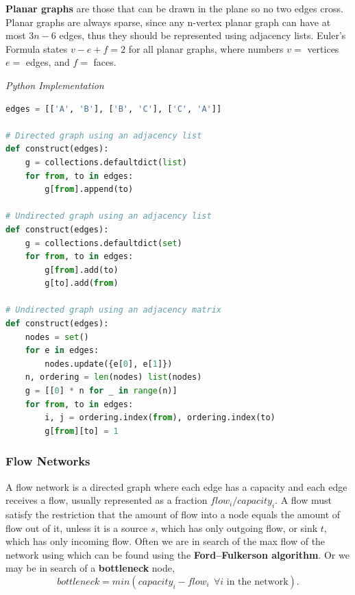 \documentclass{article}
\begin{document}
    \textbf{Planar graphs} are those that can be drawn in the plane so no two edges cross. Planar graphs are always sparse, since any n-vertex planar graph can have at most $3n - 6$ edges, thus they should be represented using adjacency lists. Euler's Formula states $v-e+f=2$ for all planar graphs, where numbers $v = $ vertices $e = $ edges, and $f = $ faces.

\vspace{8pt} \emph{Python Implementation}
\begin{lstlisting}[language=Python]
edges = [['A', 'B'], ['B', 'C'], ['C', 'A']]

# Directed graph using an adjacency list
def construct(edges):
    g = collections.defaultdict(list)
    for from, to in edges:
        g[from].append(to)
        
# Undirected graph using an adjacency list
def construct(edges):
    g = collections.defaultdict(set)
    for from, to in edges:
        g[from].add(to)
        g[to].add(from)
        
# Undirected graph using an adjacency matrix
def construct(edges):
    nodes = set()
    for e in edges:
        nodes.update({e[0], e[1]})
    n, ordering = len(nodes) list(nodes)
    g = [[0] * n for _ in range(n)]
    for from, to in edges:
        i, j = ordering.index(from), ordering.index(to)
        g[from][to] = 1
\end{lstlisting}

\subsubsection{Flow Networks}

A flow network is a directed graph where each edge has a capacity and each edge receives a flow, usually represented as a fraction $flow_i/capacity_i$. A flow must satisfy the restriction that the amount of flow into a node equals the amount of flow out of it, unless it is a source $s$, which has only outgoing flow, or sink $t$, which has only incoming flow. Often we are in search of the max flow of the network using which can be found using the \textbf{Ford–Fulkerson algorithm}. Or we may be in search of a \textbf{bottleneck} node, 
\[
    bottleneck = min(capacity_i - flow_i \ \ \forall i  \text{ in the network}).
\]
\end{document}
